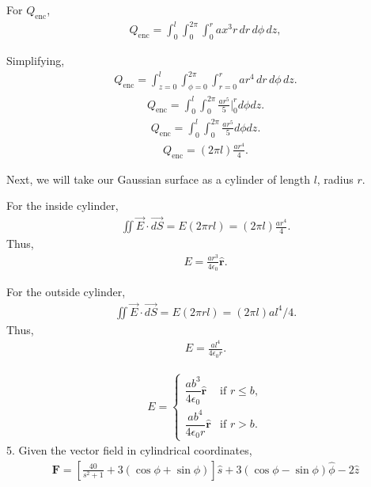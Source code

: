 \documentclass{article}
\begin{document}
For $ Q_{\text{enc}} $,
\begin{align*}
Q_{\text{enc}} = \int_0^l \int_0^{2\pi} \int_0^r a x^3 r \, dr \, d\phi \, dz,
\end{align*}

Simplifying,
\begin{align*}
Q_{\text{enc}} = \int_{z=0}^l \int_{\phi=0}^{2\pi} \int_{r=0}^r a r^4 \, dr \, d\phi \, dz.
\end{align*}
\begin{align*}
Q_{\text{enc}} = \int_0^l \int_0^{2\pi} \frac{a r^5}{5} \Big|_0^r d\phi dz.
\end{align*}
\begin{align*}
Q_{\text{enc}} = \int_0^l \int_0^{2\pi} \frac{a r^5}{5} d\phi dz.
\end{align*}
\begin{align*}
Q_{\text{enc}} = (2\pi l) \frac{a r^4}{4}.
\end{align*}

Next, we will take our Gaussian surface as a cylinder of length $ l $, radius $ r $.

For the inside cylinder,
\begin{align*}
\iint \vec{E} \cdot \vec{dS} = E (2\pi r l) = (2\pi l) \frac{a r^4}{4}.
\end{align*}
Thus,
\begin{align*}
E = \frac{a r^3}{4 \epsilon_0} \mathbf{\hat{r}}.
\end{align*}

For the outside cylinder,
\begin{align*}
\iint \vec{E} \cdot \vec{dS} = E (2\pi r l) = (2\pi l) a l^4 / 4.
\end{align*}
Thus,
\begin{align*}
E = \frac{a l^4}{4 \epsilon_0 r}.
\end{align*}

\begin{align*}
E =
\begin{cases} 
\dfrac{ab^3}{4\epsilon_0}\mathbf{\hat{r}}&\text{if }   r \leq b, \\
\dfrac{ab^4}{4\epsilon_0 r} \mathbf{\hat{r}}  & \text{if } r > b.
\end{cases}
\end{align*}
5. Given the vector field in cylindrical coordinates,
\begin{align*}
\mathbf{F} = \left[ \frac{40}{s^2 + 1} + 3(\cos \phi + \sin \phi) \right] \hat{s} 
+ 3(\cos \phi - \sin \phi) \hat{\phi} - 2\hat{z}
\end{align*}
\end{document}
